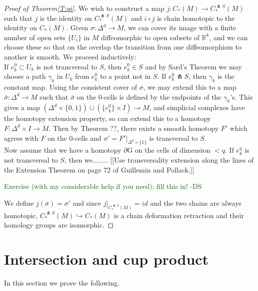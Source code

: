 \documentclass{amsart}          %
\newcommand{\forclass}[1]{\textcolor{darkgreen}{#1 -DS}}
\newcommand{\R}{\mathbb R}
\begin{document}
\begin{proof}[Proof of Theorem\ref{T:qi}] We wish to construct a map $j:C_{*}(M) \rightarrow C^{\pitchfork S}_{*}(M)$ such that $j$ is the identity on $C^{\pitchfork S}_{*}(M)$ and 
$i \circ j$ is chain homotopic to the identity on $C_{*}(M)$. Given $\sigma:\Delta^d \rightarrow M$, we can cover its image with a finite number of 
open sets $\{U_i\}$ in $M$ diffeomorphic to open subsets of $\R^k$, and we can choose these so that on the overlap the transition from one 
diffeomorphism to another is smooth. We proceed inductively: \\If $e^0_k \subset U_k$ is not transversal to $S$, then $e^0_k \in S$ and by 
Sard's Theorem we may choose a path $\gamma_k$ in $U_k$ from $e^0_k$ to a point not in $S$. If $e^0_k \pitchfork S$, then $\gamma_k$ is the 
constant map. Using the consistent cover of $\sigma$, we may extend this to a map $\bar{\sigma}:\Delta^d \rightarrow M$ such that $\bar{\sigma}$ 
on the 0-cells is defined by the endpoints of the $\gamma_k$'s. This gives a map 
$\left(\Delta^d \times \{0,1\} \right)\cup \left(\{e^0_k\} \times I \right)\rightarrow M$, and simplicial complexes have the homotopy extension property, 
so can extend this to a homotopy $F: \Delta^d \times I \rightarrow M$. Then by Theorem ??, there exists a smooth homotopy $F'$ which 
agrees with $F$ on the 0-cells and $\sigma'=\left.F'\right|_{\Delta^d \times \{1\}}$ is transversal to $S$.\\
Now assume that we have a homotopy $\partial$G on the cells of dimension $<q$. If $e^q_k $ is not transversal to $S$, then we........  
[[Use  transversality extension along the lines of the Extension Theorem on page 72 of Guillemin and Pollack.]]

\forclass{Exercise (with my considerable help if you need): fill this in!}


We define $j(\sigma) = \sigma'$ and since $\left.j\right|_{C^{\pitchfork S}_{*}(M)}=id$ and the two chains are always homotopic, $C^{\pitchfork S}_{*}(M) \hookrightarrow C_{*}(M)$ is a chain deformation retraction and their homology groups are isomorphic.
\end{proof}



\section{Intersection and cup product}

In this section we prove the following.
\end{document}

